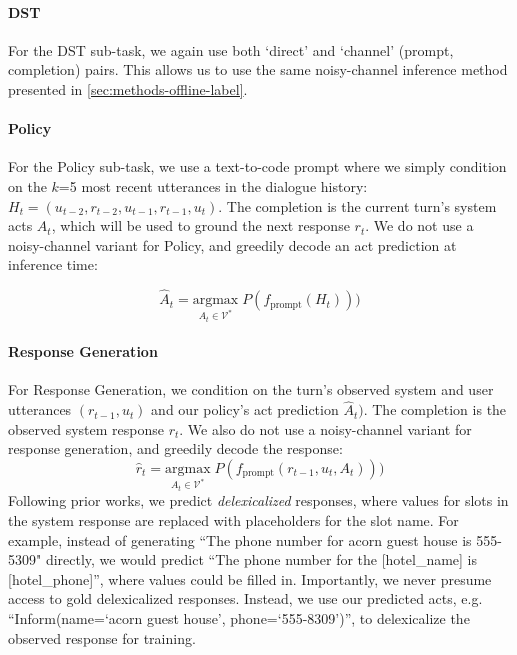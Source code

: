 \documentclass[11pt]{article}
\newcommand{\argmax}[2]{\underset{#1}{\mathrm{argmax}}\; #2}  %
\newcommand{\prompt}[0]{f_{\text{prompt}}}
\newcommand{\jmf}[1]{}
\begin{document}
\paragraph{DST} For the DST sub-task, we again use both `direct' and `channel' (prompt, completion) pairs. 
This allows us to use the same noisy-channel inference method presented in \autoref{sec:methods-offline-label}.

\paragraph{Policy} For the Policy sub-task, we use a text-to-code prompt where we simply condition on the $k$=5 most recent utterances in the dialogue history: $H_t = (u_{t-2}, r_{t-2}, u_{t-1}, r_{t-1}, u_{t})$. 
The completion is the current turn's system acts $A_t$, which will be used to ground the next response $r_t$. 
We do not use a noisy-channel variant for Policy, and greedily decode an act prediction at inference time:

$$
\hat{A}_t = \argmax{A_t \in \mathcal{V}^*}{P(\prompt(H_t)))}
$$


\paragraph{Response Generation} For Response Generation, we condition on the turn's observed system and user utterances $(r_{t-1}, u_t)$ and our policy's act prediction $\hat{A}_{t})$. The completion is the observed system response $r_t$. We also do not use a noisy-channel variant for response generation, and greedily decode the response:
$$
\hat{r}_t = \argmax{A_t \in \mathcal{V}^*}{P(\prompt(r_{t-1}, u_t, A_t)))}
$$
Following prior works, we predict \textit{delexicalized} responses, where values for slots in the system response are replaced with placeholders for the slot name. 
For example, instead of generating ``The phone number for acorn guest house is 555-5309" directly, we would predict ``The phone number for the [hotel\_name] is [hotel\_phone]'', where values could be filled in.
Importantly, we never presume access to gold delexicalized responses.
Instead, we use our predicted acts, e.g. ``Inform(name=`acorn guest house', phone=`555-8309')'', to delexicalize the observed response for training.
\end{document}
